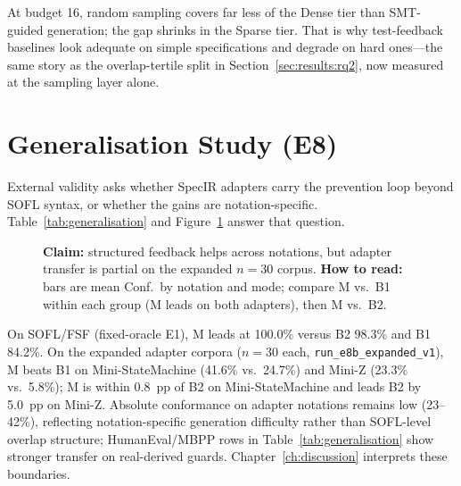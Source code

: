 At budget 16, random sampling covers far less of the Dense tier than
SMT-guided generation; the gap shrinks in the Sparse tier.
That is why test-feedback baselines look adequate on simple specifications
and degrade on hard ones---the same story as the overlap-tertile split in
Section~\ref{sec:results:rq2}, now measured at the sampling layer alone.

\section{Generalisation Study (E8)}
\label{ch:generalization}

External validity asks whether SpecIR adapters carry the prevention loop
beyond SOFL syntax, or whether the gains are notation-specific.
Table~\ref{tab:generalisation} and Figure~\ref{fig:generalisation} answer
that question.

\begin{figure}[t]
  \centering
  \caption{\textbf{Claim:} structured feedback helps across notations, but
    adapter transfer is partial on the expanded $n{=}30$ corpus.
    \textbf{How to read:} bars are mean Conf.\ by notation and mode; compare
    M vs.\ B1 within each group (M leads on both adapters), then M vs.\ B2.}
  \label{fig:generalisation}
\end{figure}

On SOFL/FSF (fixed-oracle E1), M leads at 100.0\% versus B2 98.3\% and B1 84.2\%.
On the expanded adapter corpora ($n{=}30$ each, \texttt{run\_e8b\_expanded\_v1}),
M beats B1 on Mini-StateMachine (41.6\% vs.\ 24.7\%) and Mini-Z (23.3\% vs.\
5.8\%); M is within 0.8~pp of B2 on Mini-StateMachine and leads B2 by 5.0~pp
on Mini-Z.
Absolute conformance on adapter notations remains low (23--42\%), reflecting
notation-specific generation difficulty rather than SOFL-level overlap structure;
HumanEval/MBPP rows in Table~\ref{tab:generalisation} show stronger transfer on
real-derived guards.
Chapter~\ref{ch:discussion} interprets these boundaries.

